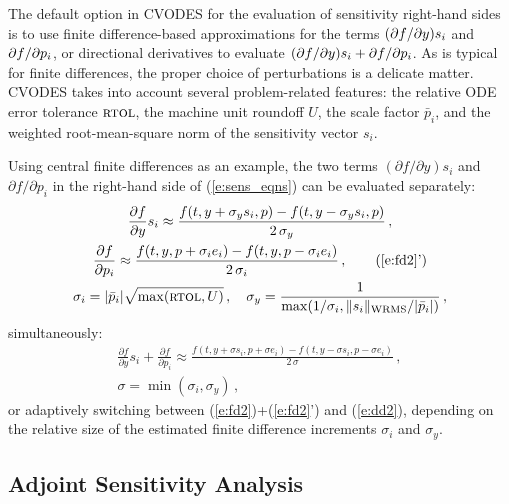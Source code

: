 The default option in CVODES for the evaluation of sensitivity right-hand 
sides is to use finite difference-based approximations for the terms $(\partial f / \partial y) s_i$ 
and $\partial f / \partial p_i$, or directional derivatives to evaluate
$(\partial f / \partial y) s_i + \partial f / \partial p_i$.
As is typical for finite differences, the proper choice of perturbations is a 
delicate matter. CVODES takes into account several problem-related features:
the relative ODE error tolerance $\mbox{\sc rtol}$, the machine unit roundoff $U$,
the scale factor ${\bar p}_i$, and the weighted root-mean-square norm of the 
sensitivity vector $s_i$.

Using central finite differences as an example, the two terms 
$({\partial f}/{\partial y}) s_i$ 
and ${\partial f}/{\partial p_i}$ in the right-hand side of (\ref{e:sens_eqns})
can be evaluated separately:
\begin{gather}
  \frac{\partial f}{\partial y} s_i \approx \frac{f(t, y+\sigma_y s_i, p)-
    f(t, y-\sigma_y s_i, p)}{2\,\sigma_y} \, , \label{e:fd2} \\
  \frac{\partial f}{\partial p_i} \approx \frac{f(t,y,p + \sigma_i e_i)-
    f(t,y,p - \sigma_i e_i)}{2\,\sigma_i} \, , \tag{\ref{e:fd2}'} \\
  \sigma_i = |{\bar p}_i| \sqrt{\max( \mbox{\sc rtol} , U)} \, , \quad
  \sigma_y = \frac{1}{\max(1/\sigma_i, \|s_i\|_{\mbox{\scriptsize WRMS}}
                                          /|{\bar p}_i|)} \, , \nonumber
\end{gather}
simultaneously:
\begin{gather}
  \frac{\partial f}{\partial y} s_i + \frac{\partial f}{\partial p_i} \approx
  \frac{f(t, y+\sigma s_i, p + \sigma e_i) -
    f(t, y-\sigma s_i, p - \sigma e_i)}{2\,\sigma} \, , \label{e:dd2} \\
  \sigma = \min(\sigma_i, \sigma_y) \, , \nonumber
\end{gather}
or adaptively switching between (\ref{e:fd2})+(\ref{e:fd2}') and (\ref{e:dd2}), 
depending on the relative size of the estimated finite difference 
increments $\sigma_i$ and $\sigma_y$.


\subsection{Adjoint Sensitivity Analysis}\label{ss:adj_sensitivity}

